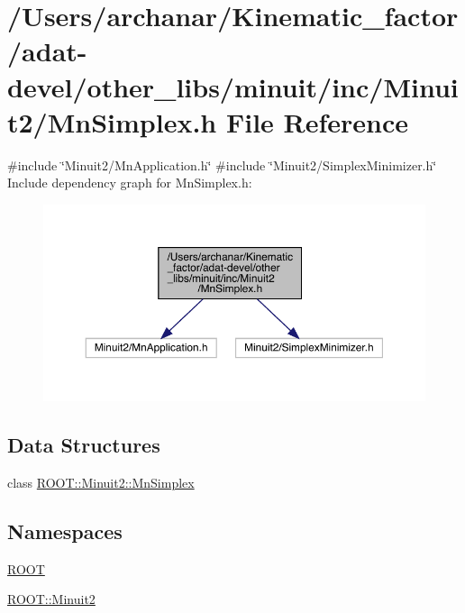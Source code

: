 \hypertarget{adat-devel_2other__libs_2minuit_2inc_2Minuit2_2MnSimplex_8h}{}\section{/\+Users/archanar/\+Kinematic\+\_\+factor/adat-\/devel/other\+\_\+libs/minuit/inc/\+Minuit2/\+Mn\+Simplex.h File Reference}
\label{adat-devel_2other__libs_2minuit_2inc_2Minuit2_2MnSimplex_8h}
{\ttfamily \#include \char`\"{}Minuit2/\+Mn\+Application.\+h\char`\"{}}\newline
{\ttfamily \#include \char`\"{}Minuit2/\+Simplex\+Minimizer.\+h\char`\"{}}\newline
Include dependency graph for Mn\+Simplex.\+h\+:
\nopagebreak
\begin{figure}[H]
\begin{center}
\leavevmode
\includegraphics[width=350pt]{de/d4d/adat-devel_2other__libs_2minuit_2inc_2Minuit2_2MnSimplex_8h__incl}
\end{center}
\end{figure}
\subsection*{Data Structures}
\begin{DoxyCompactItemize}
\item 
class \mbox{\hyperlink{classROOT_1_1Minuit2_1_1MnSimplex}{R\+O\+O\+T\+::\+Minuit2\+::\+Mn\+Simplex}}
\end{DoxyCompactItemize}
\subsection*{Namespaces}
\begin{DoxyCompactItemize}
\item 
 \mbox{\hyperlink{namespaceROOT}{R\+O\+OT}}
\item 
 \mbox{\hyperlink{namespaceROOT_1_1Minuit2}{R\+O\+O\+T\+::\+Minuit2}}
\end{DoxyCompactItemize}
